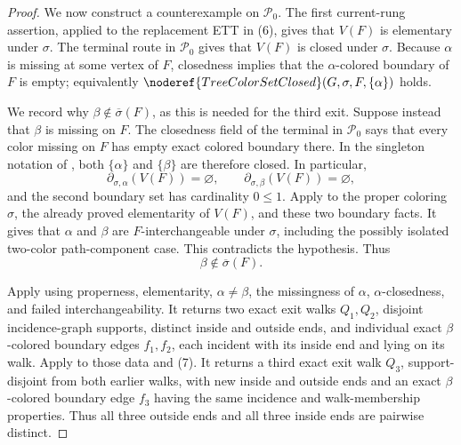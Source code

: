 \begin{proof}
We now construct a counterexample on \(\mathcal P_0\).  The first
current-rung assertion, applied to the replacement ETT in (6), gives
that \(V(F)\) is elementary under \(\sigma\).  The terminal route in
\(\mathcal P_0\) gives that \(V(F)\) is closed under \(\sigma\).
Because \(\alpha\) is missing at some vertex of \(F\), closedness implies
that the \(\alpha\)-colored boundary of \(F\) is empty; equivalently
\(\noderef{TreeColorSetClosed}(G,\sigma,F,\{\alpha\})\) holds.

We record why \(\beta\notin\overline\sigma(F)\), as this is needed for
the third exit.  Suppose instead that \(\beta\) is missing on \(F\).
The closedness field of the terminal  in
\(\mathcal P_0\) says that every color missing on \(F\) has empty exact
colored boundary there.  In the singleton notation of
, both \(\{\alpha\}\) and \(\{\beta\}\)
are therefore closed.  In particular,
\[
 \partial_{\sigma,\alpha}(V(F))=\varnothing,
 \qquad
 \partial_{\sigma,\beta}(V(F))=\varnothing,
\]
and the second boundary set has cardinality \(0\leq1\).  Apply
 to the proper coloring
\(\sigma\), the already proved elementarity of \(V(F)\), and these two
boundary facts.  It gives that \(\alpha\) and \(\beta\) are
\(F\)-interchangeable under \(\sigma\), including the possibly isolated
two-color path-component case.  This contradicts the hypothesis.  Thus
\[
                         \beta\notin\overline\sigma(F).        \tag{7}
\]

Apply  using
properness, elementarity, \(\alpha\ne\beta\), the missingness of
\(\alpha\), \(\alpha\)-closedness, and failed interchangeability.  It
returns two exact exit walks \(Q_1,Q_2\), disjoint incidence-graph
supports, distinct inside and outside ends, and individual exact
\(\beta\)-colored boundary edges \(f_1,f_2\), each incident with its
inside end and lying on its walk.  Apply
 to those data and (7).
It returns a third exact exit walk \(Q_3\), support-disjoint from both
earlier walks, with new inside and outside ends and an exact
\(\beta\)-colored boundary edge \(f_3\) having the same incidence and
walk-membership properties.  Thus all three outside ends and all three
inside ends are pairwise distinct.


\end{proof}
